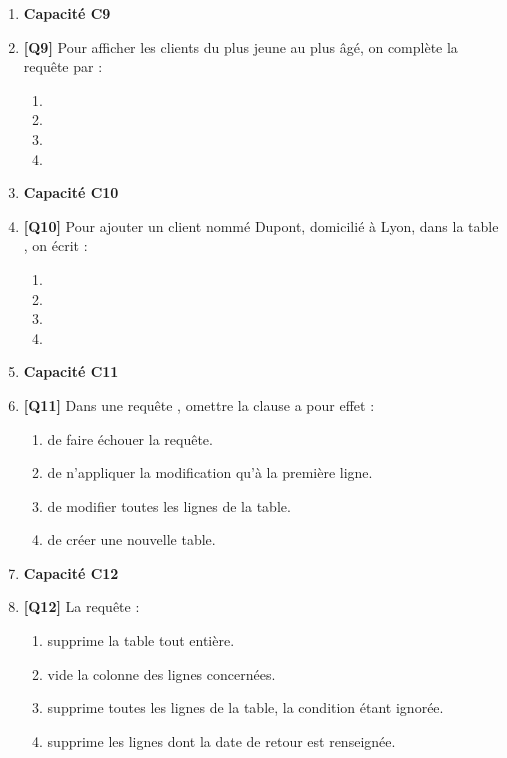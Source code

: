 \begin{enumerate}
\item[] \textbf{Capacité C9}

\item \textbf{[Q9]} Pour afficher les clients du plus jeune au plus âgé, on complète la requête par :
  \begin{enumerate}[label=\Alph*.]
    \item {}
    \item {}
    \item {}
    \item {}
  \end{enumerate}

\item[] \textbf{Capacité C10}

\item \textbf{[Q10]} Pour ajouter un client nommé Dupont, domicilié à Lyon, dans la table , on écrit :
  \begin{enumerate}[label=\Alph*.]
    \item {}
    \item {}
    \item {}
    \item {}
  \end{enumerate}

\item[] \textbf{Capacité C11}

\item \textbf{[Q11]} Dans une requête , omettre la clause  a pour effet :
  \begin{enumerate}[label=\Alph*.]
    \item de faire échouer la requête.
    \item de n'appliquer la modification qu'à la première ligne.
    \item de modifier toutes les lignes de la table.
    \item de créer une nouvelle table.
  \end{enumerate}

\item[] \textbf{Capacité C12}

\item \textbf{[Q12]} La requête  :
  \begin{enumerate}[label=\Alph*.]
    \item supprime la table  tout entière.
    \item vide la colonne  des lignes concernées.
    \item supprime toutes les lignes de la table, la condition étant ignorée.
    \item supprime les lignes dont la date de retour est renseignée.
  \end{enumerate}

\end{enumerate}

